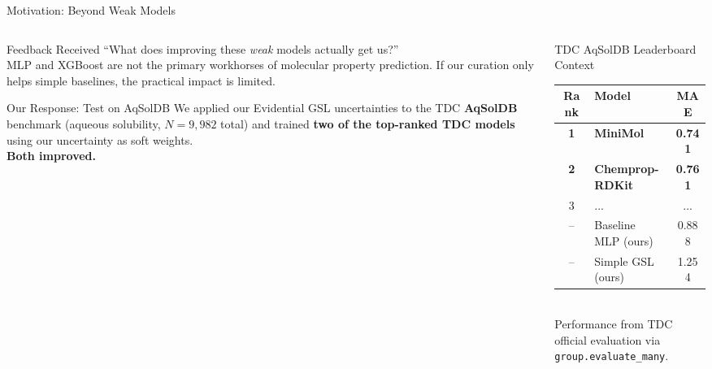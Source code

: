 \documentclass[aspectratio=169]{beamer}
\begin{document}
\begin{frame}[t]{Motivation: Beyond Weak Models}
\begin{columns}[T]
\begin{column}{0.52\textwidth}
\begin{alertblock}{Feedback Received}
\footnotesize ``What does improving these \emph{weak} models actually get us?''\\[4pt]
MLP and XGBoost are not the primary workhorses of molecular property prediction.
If our curation only helps simple baselines, the practical impact is limited.
\end{alertblock}
\vspace{6pt}
\begin{block}{Our Response: Test on AqSolDB}
\footnotesize We applied our Evidential GSL uncertainties to the TDC \textbf{AqSolDB} benchmark (aqueous solubility, $N{=}9{,}982$ total) and trained \textbf{two of the top-ranked TDC models} using our uncertainty as soft weights.\\[4pt]
\textbf{Both improved.}
\end{block}
\end{column}
\begin{column}{0.44\textwidth}
\begin{block}{TDC AqSolDB Leaderboard Context}
\footnotesize
\begin{tabular}{clc}
\toprule
\textbf{Rank} & \textbf{Model} & \textbf{MAE} \\
\midrule
\textbf{1} & \textbf{MiniMol} & \textbf{0.741} \\
\textbf{2} & \textbf{Chemprop-RDKit} & \textbf{0.761} \\
3 & ... & ... \\
-- & Baseline MLP (ours) & 0.888 \\
-- & Simple GSL (ours) & 1.254 \\
\bottomrule
\end{tabular}
\vspace{4pt}\\
{\scriptsize Performance from TDC official evaluation via \texttt{group.evaluate\_many}.}
\end{block}
\end{column}
\end{columns}
\end{frame}
\end{document}
